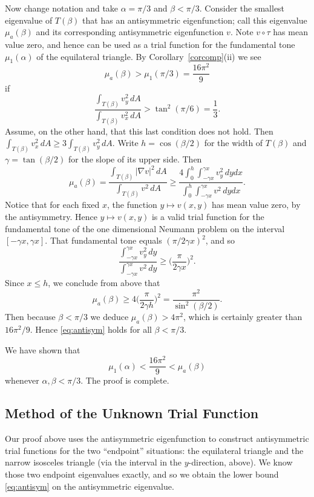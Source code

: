 \documentclass[11pt,reqno]{amsart}
\numberwithin{equation}{section}
\begin{document}
Now change notation and take $\alpha=\pi/3$ and $\beta<\pi/3$. Consider the smallest eigenvalue of $T(\beta)$ that has an antisymmetric eigenfunction; call this eigenvalue $\mu_a(\beta)$ and its corresponding antisymmetric eigenfunction $v$. Note $v \circ \tau$ has mean value zero, and hence can be used as a trial function for the fundamental tone $\mu_1(\alpha)$ of the equilateral triangle. By  Corollary~\ref{corcomp}(ii) we see
\begin{equation} \label{eq:antisym}
  \mu_a(\beta) > \mu_1(\pi/3) = \frac{16\pi^2}{9}
\end{equation}
if
\[
  \frac{\int_{T(\beta)} v_y^2 \, dA}{\int_{T(\beta)} v_x^2 \, dA}
  > \tan^2(\pi/6)=\frac{1}{3} .
\]
Assume, on the other hand, that this last condition does not hold. Then $\int_{T(\beta)} v_x^2 \, dA \geq 3 \int_{T(\beta)} v_y^2 \, dA$. Write $h=\cos(\beta/2)$ for the width of $T(\beta)$ and $\gamma=\tan(\beta/2)$ for the slope of its upper side. Then
\[
\mu_a(\beta) = \frac{\int_{T(\beta)} |\nabla v|^2 \, dA}{\int_{T(\beta)} v^2 \, dA}
\geq \frac{4 \int_0^h \int_{-\gamma x}^{\gamma x} v_y^2 \, dy dx}{\int_0^h \int_{-\gamma x}^{\gamma x} v^2 \, dy dx} .
\]
Notice that for each fixed $x$, the function $y \mapsto v(x,y)$ has mean value zero, by the antisymmetry. Hence $y \mapsto v(x,y)$ is a valid trial function for the fundamental tone of the one dimensional Neumann problem on the interval $[-\gamma x, \gamma x]$. That fundamental tone equals $(\pi/2\gamma x)^2$, and so
\[
\frac{\int_{-\gamma x}^{\gamma x} v_y^2 \, dy}{\int_{-\gamma x}^{\gamma x} v^2 \, dy} \geq \Big( \frac{\pi}{2\gamma x} \Big)^{\! 2} .
\]
Since $x \leq h$, we conclude from above that
\[
\mu_a(\beta) \geq 4 \Big( \frac{\pi}{2\gamma h} \Big)^{\! 2} = \frac{\pi^2}{\sin^2(\beta/2)} .
\]
Then because $\beta<\pi/3$ we deduce $\mu_a(\beta) > 4\pi^2$, which is certainly greater than $16\pi^2/9$. Hence \eqref{eq:antisym} holds for all $\beta<\pi/3$.

We have shown that
\[
\mu_1(\alpha) < \frac{16\pi^2}{9} < \mu_a(\beta)
\]
whenever $\alpha,\beta < \pi/3$. The proof is complete.

\subsection*{Method of the Unknown Trial Function} Our proof above uses the
antisymmetric eigenfunction to construct antisymmetric trial
functions for the two ``endpoint'' situations: the equilateral
triangle and the narrow isosceles triangle (via the interval in
the $y$-direction, above). We know those two endpoint eigenvalues
exactly, and so we obtain the lower bound \eqref{eq:antisym} on
the antisymmetric eigenvalue.
\end{document}
